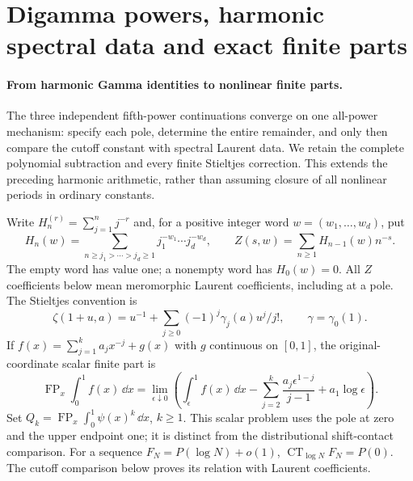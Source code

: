 \section{Digamma powers, harmonic spectral data and exact finite parts}
\label{dgp:sec:poles}

\paragraph{From harmonic Gamma identities to nonlinear finite parts.}
The three independent fifth-power continuations \cite{dgp:reports} converge
on one all-power mechanism: specify each pole, determine the entire
remainder, and only then compare the cutoff constant with spectral Laurent
data. We retain the complete polynomial subtraction and every finite
Stieltjes correction. This extends the preceding harmonic arithmetic,
rather than assuming closure of all nonlinear periods in ordinary constants.

Write $H_n^{(r)}=\sum_{j=1}^n j^{-r}$ and, for a positive integer word
$w=(w_1,\ldots,w_d)$, put
\begin{equation}\label{dgp:eq:strict-zeta}
 H_n(w)=\sum_{n\ge j_1>\cdots>j_d\ge1}j_1^{-w_1}\cdots j_d^{-w_d},
 \qquad Z(s,w)=\sum_{n\ge1}H_{n-1}(w)n^{-s}.
\end{equation}
The empty word has value one; a nonempty word has $H_0(w)=0$.
All $Z$ coefficients below mean meromorphic Laurent coefficients, including
at a pole. The Stieltjes convention is
\begin{equation}\label{dgp:eq:stieltjes-convention}
 \zeta(1+u,a)=u^{-1}+\sum_{j\ge0}(-1)^j\gamma_j(a)u^j/j!,
 \qquad \gamma=\gamma_0(1).
\end{equation}
If $f(x)=\sum_{j=1}^k a_jx^{-j}+g(x)$ with $g$ continuous on $[0,1]$,
the original-coordinate scalar finite part is
\begin{equation}\label{dgp:eq:fp-definition}
 \operatorname{FP}_x\int_0^1 f(x)\,\dd x
 =\lim_{\epsilon\downarrow0}\left(
 \int_\epsilon^1f(x)\,\dd x
 -\sum_{j=2}^k\frac{a_j\epsilon^{1-j}}{j-1}+a_1\log\epsilon\right).
\end{equation}
Set $Q_k=\operatorname{FP}_x\int_0^1\psi(x)^k\,\dd x$, $k\ge1$.
This scalar problem uses the pole at zero and the upper endpoint one;
it is distinct from the distributional shift-contact comparison.
For a sequence $F_N=P(\log N)+o(1)$, $\operatorname{CT}_{\log N}F_N=P(0)$.
The cutoff comparison below proves its relation with Laurent coefficients.

